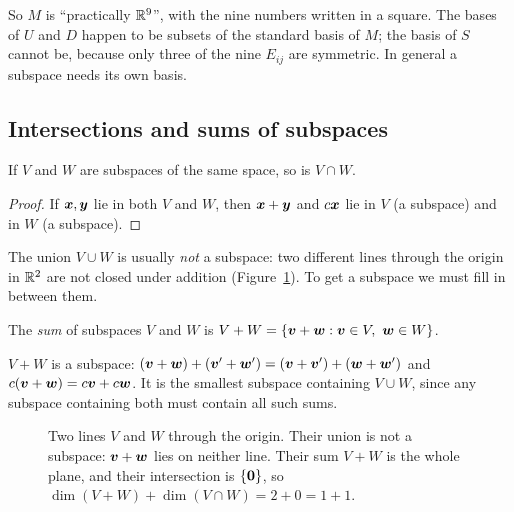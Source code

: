 So $M$ is ``practically $\mathbb{R}^9$'', with the nine numbers written in a square. The bases of $U$ and
$D$ happen to be subsets of the standard basis of $M$; the basis of $S$ cannot be, because only three
of the nine $E_{ij}$ are symmetric. In general a subspace needs its own basis.

\subsection{Intersections and sums of subspaces}

\begin{proposition}[Intersection]\label{prop:u12-cap}
If $V$ and $W$ are subspaces of the same space, so is $V\cap W$.
\end{proposition}
\begin{proof}
If $\boldsymbol{x},\boldsymbol{y}$ lie in both $V$ and $W$, then $\boldsymbol{x}+\boldsymbol{y}$ and $c\boldsymbol{x}$ lie in $V$ (a
subspace) and in $W$ (a subspace).
\end{proof}

The union $V\cup W$ is usually \emph{not} a subspace: two different lines through the origin in
$\mathbb{R}^2$ are not closed under addition (Figure~\ref{fig:u12-sum}). To get a subspace we must fill in
between them.

\begin{definition}\label{def:u12-sum}
The \emph{sum} of subspaces $V$ and $W$ is $V+W=\{\vb{v}+\vb{w}:\vb{v}\in V,\ \vb{w}\in W\}$.
\end{definition}

$V+W$ is a subspace: $(\boldsymbol{v}+\boldsymbol{w})+(\boldsymbol{v}'+\boldsymbol{w}')=(\boldsymbol{v}+\boldsymbol{v}')+(\boldsymbol{w}+\boldsymbol{w}')$ and
$c(\boldsymbol{v}+\boldsymbol{w})=c\boldsymbol{v}+c\boldsymbol{w}$. It is the smallest subspace containing $V\cup W$, since any
subspace containing both must contain all such sums.

\begin{figure}[ht]\centering
{}
\caption{Two lines $V$ and $W$ through the origin. Their union is not a subspace: $\boldsymbol{v}+\boldsymbol{w}$
lies on neither line. Their sum $V+W$ is the whole plane, and their intersection is $\{\boldsymbol{0}\}$,
so $\dim(V+W)+\dim(V\cap W)=2+0=1+1$.}
\label{fig:u12-sum}
\end{figure}

